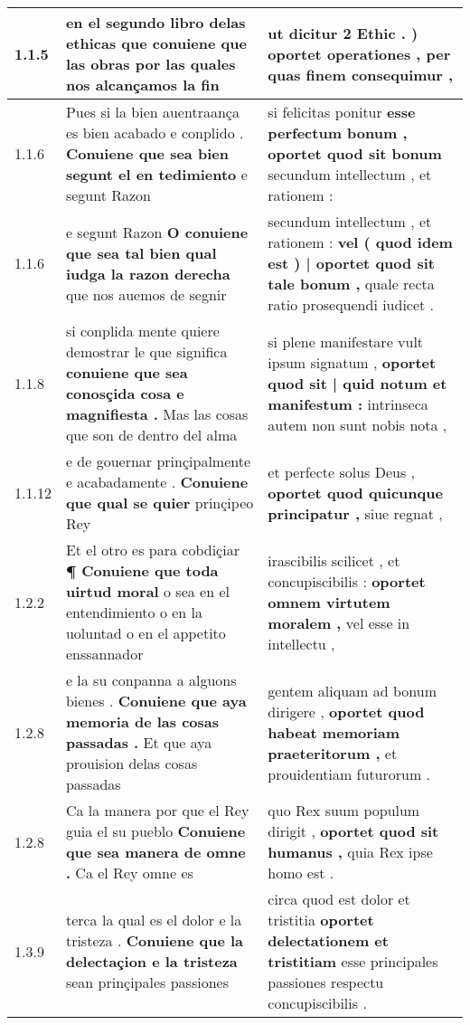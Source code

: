 \begin{tabular}{|p{1cm}|p{6.5cm}|p{6.5cm}|}

\hline
1.1.5 & en el segundo libro delas ethicas \textbf{ que conuiene que las obras } por las quales nos alcançamos la fin & ut dicitur 2 Ethic . ) \textbf{ oportet operationes , } per quas finem consequimur , \\\hline
1.1.6 & Pues si la bien auentraança es bien acabado e conplido . \textbf{ Conuiene que sea bien segunt el en tedimiento } e segunt Razon & si felicitas ponitur \textbf{ esse perfectum bonum , oportet quod sit bonum } secundum intellectum , et rationem : \\\hline
1.1.6 & e segunt Razon \textbf{ O conuiene que sea tal bien qual iudga la razon derecha } que nos auemos de segnir & secundum intellectum , et rationem : \textbf{ vel ( quod idem est ) | oportet quod sit tale bonum , } quale recta ratio prosequendi iudicet . \\\hline
1.1.8 & si conplida mente quiere demostrar le que significa \textbf{ conuiene que sea conosçida cosa e magnifiesta . } Mas las cosas que son de dentro del alma & si plene manifestare vult ipsum signatum , \textbf{ oportet quod sit | quid notum et manifestum : } intrinseca autem non sunt nobis nota , \\\hline
1.1.12 & e de gouernar prinçipalmente e acabadamente . \textbf{ Conuiene que qual se quier } prinçipeo Rey & et perfecte solus Deus , \textbf{ oportet quod quicunque principatur , } siue regnat , \\\hline
1.2.2 & Et el otro es para cobdiçiar \textbf{ ¶ Conuiene que toda uirtud moral } o sea en el entendimiento o en la uoluntad o en el appetito enssannador & irascibilis scilicet , et concupiscibilis : \textbf{ oportet omnem virtutem moralem , } vel esse in intellectu , \\\hline
1.2.8 & e la su conpanna a alguons bienes . \textbf{ Conuiene que aya memoria de las cosas passadas . } Et que aya prouision delas cosas passadas & gentem aliquam ad bonum dirigere , \textbf{ oportet quod habeat memoriam praeteritorum , } et prouidentiam futurorum . \\\hline
1.2.8 & Ca la manera por que el Rey guia el su pueblo \textbf{ Conuiene que sea manera de omne . } Ca el Rey omne es & quo Rex suum populum dirigit , \textbf{ oportet quod sit humanus , } quia Rex ipse homo est . \\\hline
1.3.9 & terca la qual es el dolor e la tristeza . \textbf{ Conuiene que la delectaçion e la tristeza } sean prinçipales passiones & circa quod est dolor et tristitia \textbf{ oportet delectationem et tristitiam } esse principales passiones respectu concupiscibilis . \\\hline

\end{tabular}
